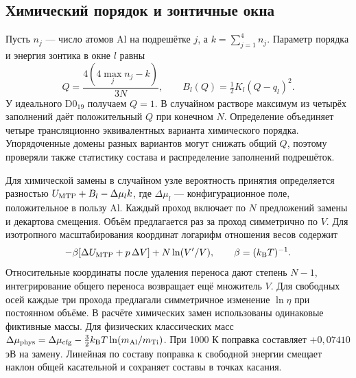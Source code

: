 \documentclass[11pt,a4paper]{article}
\begin{document}
\subsection{Химический порядок и зонтичные окна}
Пусть \(n_j\) — число атомов Al на подрешётке \(j\), а \(k=\sum_{j=1}^4 n_j\).
Параметр порядка и энергия зонтика в окне \(l\) равны
\begin{equation}
 Q=\frac{4(4\max_j n_j-k)}{3N},\qquad
 B_l(Q)=\tfrac12 K_l(Q-q_l)^2 .
\end{equation}
У идеального D0$_{19}$ получаем \(Q=1\). В случайном растворе максимум
из четырёх заполнений даёт положительный \(Q\) при конечном \(N\).
Определение объединяет четыре трансляционно эквивалентных варианта
химического порядка. Упорядоченные домены разных
вариантов могут снижать общий \(Q\), поэтому проверяли также статистику
состава и распределение заполнений подрешёток.

Для химической замены в случайном узле вероятность принятия определяется
разностью \(U_{\rm MTP}+B_l-\Delta\mu_l k\), где \(\Delta\mu_l\) —
конфигурационное поле, положительное в пользу Al. Каждый проход включает
по \(N\) предложений замены и декартова смещения. Объём предлагается раз
за проход симметрично по \(V\). Для изотропного масштабирования координат
логарифм отношения весов содержит
\[
 -\beta[\Delta U_{\rm MTP}+p\,\Delta V]+N\ln(V'/V),
 \qquad \beta=(k_{\rm B}T)^{-1}.
\]
Относительные координаты после удаления переноса дают степень \(N-1\),
интегрирование общего переноса возвращает ещё множитель \(V\).
Для свободных осей каждые три прохода предлагали симметричное изменение
\(\ln\eta\) при постоянном объёме. В расчёте химических замен использованы
одинаковые фиктивные массы. Для физических классических масс
\(\Delta\mu_{\rm phys}=\Delta\mu_{\rm cfg}
 -\tfrac32 k_{\rm B}T\ln(m_{\rm Al}/m_{\rm Ti})\).
При 1000 К поправка составляет \(+0{,}07410\) эВ на замену.
Линейная по составу поправка к свободной энергии смещает наклон общей
касательной и сохраняет составы в точках касания.
\end{document}
